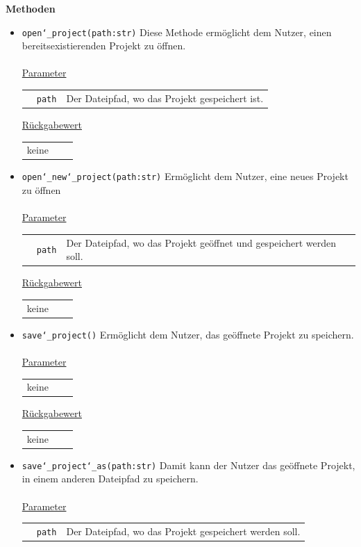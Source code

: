 \documentclass{article}
\begin{document}
\textbf{{Methoden}}
\begin{itemize}
\item \texttt{open\char`_project(path:str)} \newline Diese Methode ermöglicht dem Nutzer, einen bereitsexistierenden Projekt zu öffnen.
\\\\
\underline{{Parameter}}
\begin{tabular}{lll}
 & \texttt{path} & Der Dateipfad, wo das Projekt gespeichert ist. \\
\end{tabular}

\underline{{Rückgabewert}}
\begin{tabular}{lll}
 keine \\
\end{tabular}

\item \texttt{open\char`_new\char`_project(path:str)} \newline Ermöglicht dem Nutzer, eine neues Projekt zu öffnen
\\\\
\underline{{Parameter}}
\begin{tabular}{lll}
 & \texttt{path} & Der Dateipfad, wo das Projekt geöffnet und gespeichert werden soll. \\
\end{tabular}

\underline{{Rückgabewert}}
\begin{tabular}{lll}
 keine \\
\end{tabular}

\item \texttt{save\char`_project()} \newline Ermöglicht dem Nutzer, das geöffnete Projekt zu speichern.
\\\\
\underline{{Parameter}}
\begin{tabular}{lll}
 keine \\
\end{tabular}

\underline{{Rückgabewert}}
\begin{tabular}{lll}
 keine \\
\end{tabular}

\item \texttt{save\char`_project\char`_as(path:str)} \newline Damit kann der Nutzer das geöffnete Projekt, in einem  anderen Dateipfad zu speichern.
\\\\
\underline{{Parameter}}
\begin{tabular}{lll}
 & \texttt{path} & Der Dateipfad, wo das Projekt gespeichert werden soll. \\
\end{tabular}


\end{itemize}
\end{document}
